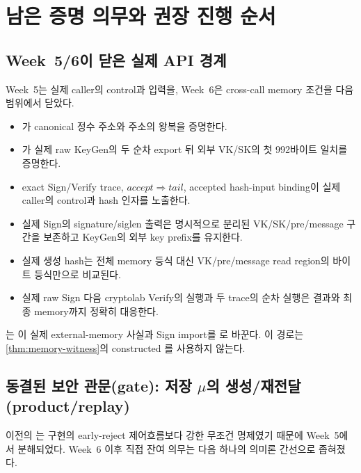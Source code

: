 \section{남은 증명 의무와 권장 진행 순서}
\label{sec:open-obligations}

\subsection{Week~5/6이 닫은 실제 API 경계}

Week~5는 실제 caller의 control과 입력을, Week~6은 cross-call memory 조건을
다음 범위에서 닫았다.

\begin{itemize}
  \item {}가 canonical 정수 주소와
         주소의 왕복을 증명한다.
  \item {}가 실제 raw KeyGen의
        두 순차 export 뒤 외부 VK/SK의 첫 992바이트 일치를 증명한다.
  \item exact Sign/Verify trace, \(accept\Rightarrow tail\), accepted hash-input
        binding이 실제 caller의 control과 hash 인자를 노출한다.
  \item 실제 Sign의 signature/siglen 출력은 명시적으로 분리된 VK/SK/pre/message
        구간을 보존하고 KeyGen의 외부 key prefix를 유지한다.
  \item 실제 생성 hash는 전체 memory 등식 대신 VK/pre/message read region의
        바이트 등식만으로 비교된다.
  \item 실제 raw Sign 다음 cryptolab Verify의 실행과 두 trace의 순차 실행은
        결과와 최종 memory까지 정확히 대응한다.
\end{itemize}

는 이 실제 external-memory 사실과
Sign import를 로 바꾼다. 이 경로는
\cref{thm:memory-witness}의 constructed 를 사용하지 않는다.

\subsection{동결된 보안 관문(gate): 저장 \texorpdfstring{\(\mu\)}{mu}의 생성/재전달(product/replay)}

이전의 는 구현의 early-reject 제어흐름보다 강한
무조건 명제였기 때문에 Week~5에서 분해되었다. Week~6 이후 직접 잔여 의무는
다음 하나의 의미론 간선으로 좁혀졌다.

